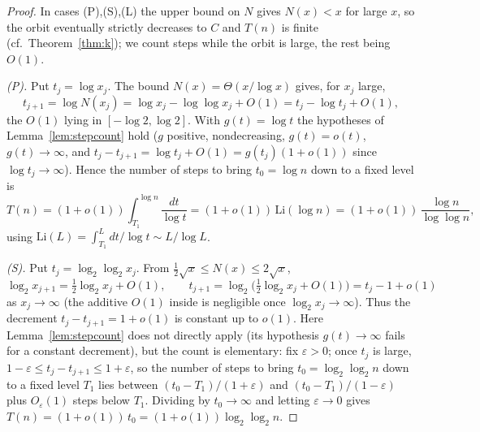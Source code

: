 \documentclass[12pt]{article}
\theoremstyle{definition}
\begin{document}
\begin{proof}
In cases (P),(S),(L) the upper bound on $N$ gives $N(x)<x$ for large $x$, so the
orbit eventually strictly decreases to $C$ and $T(n)$ is finite
(cf.\ Theorem~\ref{thm:k}); we count steps while the orbit is large, the rest being
$O(1)$.

\smallskip
\emph{(P).} Put $t_j=\log x_j$. The bound $N(x)=\Theta(x/\log x)$ gives, for $x_j$
large,
\[
  t_{j+1}=\log N(x_j)=\log x_j-\log\log x_j+O(1)=t_j-\log t_j+O(1),
\]
the $O(1)$ lying in $[-\log2,\log2]$. With $g(t)=\log t$ the hypotheses of
Lemma~\ref{lem:stepcount} hold ($g$ positive, nondecreasing, $g(t)=o(t)$,
$g(t)\to\infty$, and $t_j-t_{j+1}=\log t_j+O(1)=g(t_j)(1+o(1))$ since
$\log t_j\to\infty$). Hence the number of steps to bring $t_0=\log n$ down to a fixed
level is
\[
  T(n)=(1+o(1))\int_{T_1}^{\log n}\frac{dt}{\log t}
      =(1+o(1))\,\mathrm{Li}(\log n)
      =(1+o(1))\,\frac{\log n}{\log\log n},
\]
using $\mathrm{Li}(L)=\int_{T_1}^{L}dt/\log t\sim L/\log L$.

\smallskip
\emph{(S).} Put $t_j=\log_2\log_2 x_j$. From $\tfrac12\sqrt x\le N(x)\le2\sqrt x$,
\[
  \log_2 x_{j+1}=\tfrac12\log_2 x_j+O(1),\qquad
  t_{j+1}=\log_2\bigl(\tfrac12\log_2 x_j+O(1)\bigr)=t_j-1+o(1)
\]
as $x_j\to\infty$ (the additive $O(1)$ inside is negligible once $\log_2 x_j\to\infty$).
Thus the decrement $t_j-t_{j+1}=1+o(1)$ is constant up to $o(1)$. Here
Lemma~\ref{lem:stepcount} does not directly apply (its hypothesis $g(t)\to\infty$
fails for a constant decrement), but the count is elementary: fix $\varepsilon>0$;
once $t_j$ is large, $1-\varepsilon\le t_j-t_{j+1}\le1+\varepsilon$, so the number of
steps to bring $t_0=\log_2\log_2 n$ down to a fixed level $T_1$ lies between
$(t_0-T_1)/(1+\varepsilon)$ and $(t_0-T_1)/(1-\varepsilon)$ plus $O_\varepsilon(1)$
steps below $T_1$. Dividing by $t_0\to\infty$ and letting $\varepsilon\to0$ gives
$T(n)=(1+o(1))\,t_0=(1+o(1))\log_2\log_2 n$.


\end{proof}
\end{document}
